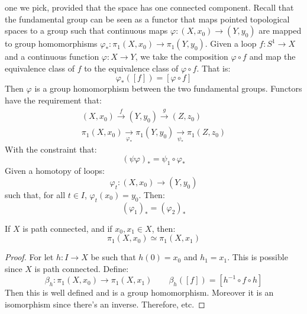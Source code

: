 \documentclass{book}                                                           %
\begin{document}
        one we pick, provided that the space has one connected
        component. Recall that the fundamental group can be
        seen as a functor that maps pointed topological
        spaces to a group such that continuous maps
        $\varphi:(X,x_{0})\rightarrow(Y,y_{0})$ are mapped
        to group homomorphisms
        $\varphi_{*}:\pi_{1}(X,x_{0})\rightarrow\pi_{1}(Y,y_{0})$.
        Given a loop $f:S^{1}\rightarrow{X}$ and a continuous
        function $\varphi:X\rightarrow{Y}$, we take the
        composition $\varphi\circ{f}$ and map the equivalence
        class of $f$ to the equivalence class of
        $\varphi\circ{f}$. That is:
        \begin{equation}
            \varphi_{*}([f])=[\varphi\circ{f}]
        \end{equation}
        Then $\varphi$ is a group homomorphism between the
        two fundamental groups. Functors have the requirement
        that:
        \begin{align}
            (X,x_{0})\overset{f}{\longrightarrow}
            (Y,y_{0})\overset{g}{\longrightarrow}
            (Z,z_{0})\\
            \pi_{1}(X,x_{0})
                \underset{\varphi_{*}}{\longrightarrow}
            \pi_{1}(Y,y_{0})
                \underset{\psi_{*}}{\longrightarrow}
            \pi_{1}(Z,z_{0})
        \end{align}
        With the constraint that:
        \begin{equation}
            (\psi\varphi)_{*}=\psi_{1}\circ\varphi_{*}
        \end{equation}
        Given a homotopy of loops:
        \begin{equation}
            \varphi_{t}:(X,x_{0})\rightarrow(Y,y_{0})
        \end{equation}
        such that, for all $t\in{I}$, $\varphi_{t}(x_{0})=y_{0}$.
        Then:
        \begin{equation}
            (\varphi_{1})_{*}=(\varphi_{2})_{*}
        \end{equation}
        \begin{theorem}
            If $X$ is path connected, and if $x_{0},x_{1}\in{X}$,
            then:
            \begin{equation}
                \pi_{1}(X,x_{0})\simeq\pi_{1}(X,x_{1})
            \end{equation}
        \end{theorem}
        \begin{proof}
            For let $h:I\rightarrow{X}$ be such that
            $h(0)=x_{0}$ and $h_{1}=x_{1}$. This is possible
            since $X$ is path connected. Define:
            \begin{equation}
                \beta_{h}:\pi_{1}(X,x_{0})\rightarrow
                \pi_{1}(X,x_{1})\quad\quad
                \beta_{h}([f])=[h^{\minus{1}}\circ{f}\circ{h}]
            \end{equation}
            Then this is well defined and is a group homomorphism.
            Moreover it is an isomorphism since there's an
            inverse. Therefore, etc.
        \end{proof}
\end{document}
